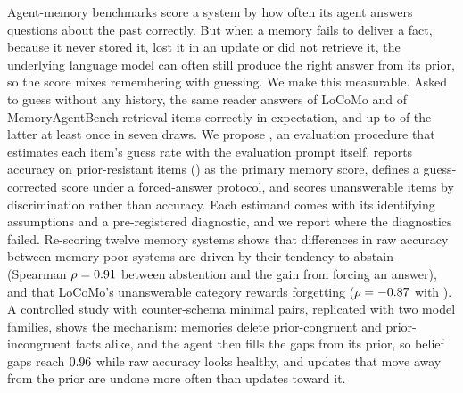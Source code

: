 Agent-memory benchmarks score a system by how often its agent answers questions about the past correctly. But when a memory fails to deliver a fact, because it never stored it, lost it in an update or did not retrieve it, the
underlying language model can often still produce the right answer from its prior, so the score mixes remembering with
guessing. We make this measurable. Asked to guess without any history, the same reader answers
\gLocomoPct{} of LoCoMo and \gQaOnePct{} of MemoryAgentBench retrieval items correctly in expectation, and up to \everQaOne{}
of the latter at least once in seven draws. We propose \pcme{}, an evaluation procedure that estimates each item's
guess rate with the evaluation prompt itself, reports accuracy on prior-resistant items (\cpr{}) as the primary memory
score, defines a guess-corrected score under a forced-answer protocol, and scores unanswerable items by discrimination
rather than accuracy. Each estimand comes with its identifying assumptions and a pre-registered diagnostic, and we
report where the diagnostics failed. Re-scoring twelve memory systems shows that differences in raw accuracy between
memory-poor systems are driven by their tendency to abstain (Spearman $\rho=0.91$ between abstention and the gain
from forcing an answer), and that LoCoMo's unanswerable category rewards forgetting ($\rho=-0.87$ with \cpr{}). A
controlled study with \nFinal{} counter-schema minimal pairs, replicated with two model families, shows the mechanism:
memories delete prior-congruent and prior-incongruent facts alike, and the agent then fills the gaps from its prior, so
belief gaps reach $0.96$ while raw accuracy looks healthy, and updates that move away from the prior are undone more
often than updates toward it.
